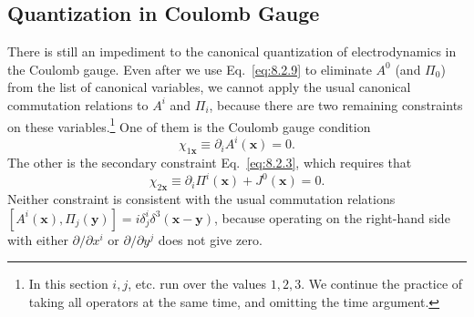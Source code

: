 
\subsection{Quantization in Coulomb Gauge}

There is still an impediment to the canonical quantization of
electrodynamics in the Coulomb gauge. Even after we use Eq.~\eqref{eq:8.2.9} to
eliminate $A^0$ (and $\Pi_0$) from the list of canonical variables, we cannot
apply the usual canonical commutation relations to $A^i$ and $\Pi_i$, because
there are two remaining constraints on these variables.\footnote{In this
section $i,j$, etc. run over the values $1,2,3$. We continue the practice of
taking all operators at the same time, and omitting the time argument.} One
of them is the Coulomb gauge condition
\begin{equation}
  \chi_{1\mathbf x}\equiv\partial_iA^i(\mathbf x)=0.
  \tag{8.3.1}\label{eq:8.3.1}
\end{equation}
The other is the secondary constraint Eq.~\eqref{eq:8.2.3}, which requires that
\begin{equation}
  \chi_{2\mathbf x}\equiv\partial_i\Pi^i(\mathbf x)+J^0(\mathbf x)=0.
  \tag{8.3.2}\label{eq:8.3.2}
\end{equation}
Neither constraint is consistent with the usual commutation relations
$[A^i(\mathbf x),\Pi_j(\mathbf y)]=i\delta^i_j\delta^3(\mathbf x-\mathbf y)$,
because operating on the right-hand side with either $\partial/\partial x^i$
or $\partial/\partial y^j$ does not give zero.


